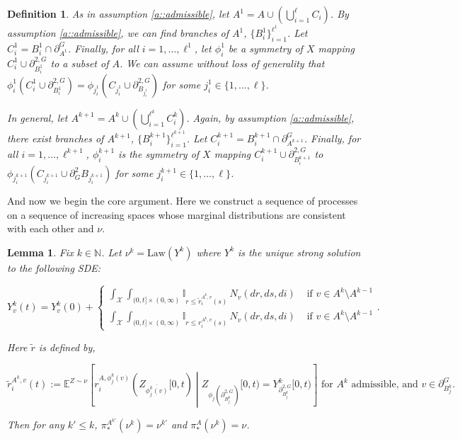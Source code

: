 \documentclass[12pt]{article}
\newcommand{\mb}{\mathbb}
\newcommand{\mc}{\mathcal}
\newcommand{\ov}{\overline}
\newcommand{\te}{\text}
\newcommand{\ind}{\hspace{24pt}}
\newcommand{\exmu}[2]{\mb{E}^{#1}\left[#2\right]}	%
\newcommand{\defeq}{:=}								%
\newcommand{\sta}{\mc{X}}							%
\newcommand{\dneigh}[1]{\partial^2_{#1}}			%
\newcommand{\gneigh}[2]{\partial^{#1}_{#2}}			%
\newcommand{\dgneigh}[2]{\partial^{2,#1}_{#2}}		%
\newcommand{\cl}[1]{\ov{#1}}						%
\newcommand{\indx}[1]{^{#1}}						%
\newcommand{\Xf}{X}									%
\newcommand{\poiss}{N}								%
\newcommand{\Sm}{\ell}								%
\newcommand{\rate}{r}								%
\newcommand{\proj}{\pi}								%
\newcommand{\poissv}[1]{_{#1}}						%
\newcommand{\vind}[1]{_{#1}}						%
\newcommand{\tme}[1]{(#1)}							%
\newcommand{\tmi}[1]{#1}							%
\newcommand{\vpara}[1]{^{#1}}						%
\newcommand{\stpara}[1]{_{#1}}						%
\newcommand{\gvpara}[2]{^{#1,#2}}					%
\newcommand{\psf}{_*}								%
\newcommand{\Xg}{Y}									%
\newcommand{\brate}{\alt{\rate}}					%
\newcommand{\alt}[1]{\tilde{#1}}					%
\newcommand{\mm}{\nu}								%
\newcommand{\law}{\te{Law}}							%
\newcommand{\Xh}{Z}									%
\newtheorem{lem}[thms]{Lemma}
\newtheorem{defn}[thms]{Definition}
\begin{document}
\begin{defn}
As in assumption \ref{a::admissible}, let \(A\indx{1} = A\cup\left(\bigcup_{i=1}^\Sm C_i\right)\). By assumption \ref{a::admissible}, we can find branches of \(A\indx{1}\), \(\{B_i\indx{1}\}_{i=1}^{\Sm\indx{1}}\). Let \(C_i\indx{1} = B_i\indx{1}\cap\gneigh{G}{A\indx{1}}\). Finally, for all \(i = 1,\dots,\Sm\indx{1}\), let \(\phi_i\indx{1}\) be a symmetry of \(\Xf\) mapping \(C_i\indx{1}\cup \dgneigh{G}{B\indx{1}_i}\) to a subset of \(A\). We can assume without loss of generality that \(\phi_i\indx{1}(C_i\indx{1}\cup \dgneigh{G}{B\indx{1}_i}) = \phi_{j\indx{1}_i}(C_{j\indx{1}_i}\cup\dgneigh{G}{B_{j\indx{1}_i}})\) for some \(j\indx{1}_i \in \{1,\dots,\Sm\}\).

\ind In general, let \(A\indx{k+1} = A\indx{k} \cup \left(\bigcup_{i=1}^{\Sm\indx{k}} C_i\indx{k}\right)\). Again, by assumption \ref{a::admissible}, there exist branches of \(A\indx{k+1}\), \(\{B_i\indx{k+1}\}_{i=1}^{\Sm\indx{k+1}}\). Let \(C_i\indx{k+1} = B_i\indx{k+1}\cap \gneigh{G}{A\indx{k+1}}\). Finally, for all \(i=1,\dots,\Sm\indx{k+1}\), \(\phi_i\indx{k+1}\) is the symmetry of \(\Xf\) mapping \(C_i\indx{k+1}\cup\dgneigh{G}{B_i\indx{k+1}}\) to \(\phi_{j\indx{k+1}_i}(C_{j\indx{k+1}_i}\cup\dneigh{G}{B_{j\indx{k+1}_i}})\) for some \(j\indx{k+1}_i \in \{1,\dots,\Sm\}\).
\end{defn}

And now we begin the core argument. Here we construct a sequence of processes on a sequence of increasing spaces whose marginal distributions are consistent with each other and \(\mm\).

\begin{lem}
Fix \(k \in \mb{N}\). Let \(\mm\indx{k} = \law(\Xg\indx{k})\) where \(\Xg\indx{k}\) is the unique strong solution to the following SDE:

\begin{equation}
\Xg\indx{k}\vind{v}\tme{t} = \Xg\indx{k}\vind{v}\tme{0} + 
\begin{cases}
\int_\sta\int_{(0,t]\times(0,\infty)} \mb{I}_{r \leq \brate\gvpara{A\indx{k}}{v}\stpara{i}\tme{s}}\,\poiss\poissv{v}(dr,ds,di) &\te{ if } v \in A\indx{k}\setminus A\indx{k-1}\\
\int_\sta\int_{(0,t]\times(0,\infty)} \mb{I}_{r \leq \rate\gvpara{A\indx{k}}{v}\stpara{i}\tme{s}}\,\poiss\poissv{v}(dr,ds,di) &\te{ if } v \in A\indx{k}\setminus A\indx{k-1}
\end{cases}.
\label{Uq::exteqn}
\end{equation}

Here \(\brate\) is defined by,

\[\brate\gvpara{A\indx{k}}{v}\stpara{i}(t) \defeq \exmu{\Xh\sim \mm}{\rate\gvpara{A}{\phi_j\indx{k}(v)}\stpara{i}(\Xh\vind{\cl{\phi_j\indx{k}(v)}}\tmi{[0,t)}\middle|\Xh\vind{\phi_j\left(\dgneigh{G}{B\indx{k}_j}\right)}\tmi{[0,t)} = \Xg\indx{k}\vind{\dgneigh{G}{B\indx{k}_j}}\tmi{[0,t)}} \te{ for } A\indx{k}\te{ admissible, and } v \in \gneigh{G}{B\indx{k}_j}.\]

Then for any \(k' \leq k\), \(\proj\psf\vpara{A\indx{k'}}(\mm\indx{k}) = \mm\indx{k'}\) and \(\proj\psf\vpara{A}(\mm\indx{k}) = \mm\).
\label{Uq::ext}
\end{lem}
\end{document}
